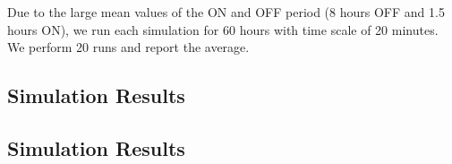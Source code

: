 Due to the large mean values of the ON and OFF period (8 hours OFF and 1.5 hours ON), we run each simulation for 60 hours with time scale of 20 minutes. We perform 20 runs and report the average. 
 
\subsection{Simulation Results}
 
%
%
%
%

\subsection{Simulation Results}

